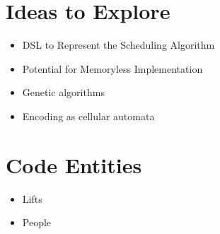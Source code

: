 \documentclass{article}
\begin{document}
\section{Ideas to Explore}
\begin{itemize}
   \item DSL to Represent the Scheduling Algorithm
   \item Potential for Memoryless Implementation
   \item Genetic algorithms
   \item Encoding as cellular automata
\end{itemize}

\section{Code Entities}
\begin{itemize}
  \item Lifts
  \item People
\end{itemize}
\end{document}
